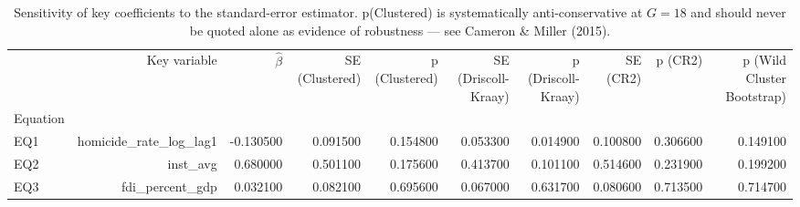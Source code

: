 \begin{table}
\caption{Sensitivity of key coefficients to the standard-error estimator. p(Clustered) is systematically anti-conservative at $G=18$ and should never be quoted alone as evidence of robustness — see Cameron \& Miller (2015).}
\label{tab:se_comparison}
\begin{tabular}{lrrrrrrrrr}
\toprule
 & Key variable & $\hat\beta$ & SE (Clustered) & p (Clustered) & SE (Driscoll-Kraay) & p (Driscoll-Kraay) & SE (CR2) & p (CR2) & p (Wild Cluster Bootstrap) \\
Equation &  &  &  &  &  &  &  &  &  \\
\midrule
EQ1 & homicide\_rate\_log\_lag1 & -0.130500 & 0.091500 & 0.154800 & 0.053300 & 0.014900 & 0.100800 & 0.306600 & 0.149100 \\
EQ2 & inst\_avg & 0.680000 & 0.501100 & 0.175600 & 0.413700 & 0.101100 & 0.514600 & 0.231900 & 0.199200 \\
EQ3 & fdi\_percent\_gdp & 0.032100 & 0.082100 & 0.695600 & 0.067000 & 0.631700 & 0.080600 & 0.713500 & 0.714700 \\
\bottomrule
\end{tabular}
\end{table}
